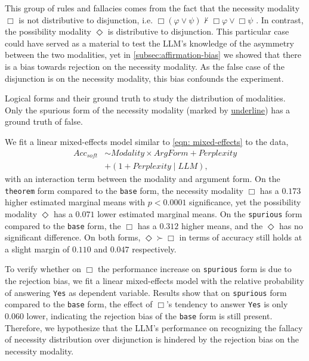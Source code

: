 This group of rules and fallacies comes from the fact that the necessity modality $\Box$ is not distributive to disjunction, i.e. $\Box (\varphi \lor \psi) \nvdash \Box \varphi \lor \Box \psi$ \citep[Ex. 5]{xiang-2019a-two-types}.
In contrast, the possibility modality $\Diamond$ is distributive to disjunction.
This particular case could have served as a material to test the LLM's knowledge of the asymmetry between the two modalities,
yet in \cref{subsec:affirmation-bias} we showed that there is a bias towards rejection on the necessity modality.
As the false case of the disjunction is on the necessity modality, this bias confounds the experiment.


\begin{table}[t]
    
    \caption{
        \label{tab:extra-distribution-forms}
        Logical forms and their ground truth to study the distribution of modalities.
        Only the spurious form of the necessity modality (marked by \uline{underline}) has a ground truth of false.
    }
\end{table}

We fit a linear mixed-effects model similar to \cref{eqn: mixed-effects} to the data,
\noindent
\begin{align}
    \mathit{Acc}_\textit{soft} & \sim \textit{Modality} \times \textit{ArgForm} + \textit{Perplexity} \nonumber \\
                               & + (1 + \textit{Perplexity} \mid \textit{LLM}), \nonumber
\end{align}
\noindent
with an interaction term between the modality and argument form.
On the \texttt{theorem} form compared to the \texttt{base} form, the necessity modality $\Box$ has a $0.173$ higher estimated marginal means with $p < 0.0001$ significance, yet the possibility modality $\Diamond$ has a $0.071$ lower estimated marginal means.
On the \texttt{spurious} form compared to the \texttt{base} form, the $\Box$ has a $0.312$ higher means, and the $\Diamond$ has no significant difference.
On both forms, $\Diamond \succ \Box$ in terms of accuracy still holds at a slight margin of $0.110$ and $0.047$ respectively.

To verify whether on $\Box$ the performance increase on \texttt{spurious} form is due to the rejection bias, we fit a linear mixed-effects model with the relative probability of answering \texttt{Yes} as dependent variable.
Results show that on \texttt{spurious} form compared to the \texttt{base} form, the effect of $\Box$'s tendency to answer \texttt{Yes} is only $0.060$ lower, indicating the rejection bias of the \texttt{base} form is still present.
Therefore, we hypothesize that the LLM's performance on recognizing the fallacy of necessity distribution over disjunction is hindered by the rejection bias on the necessity modality.